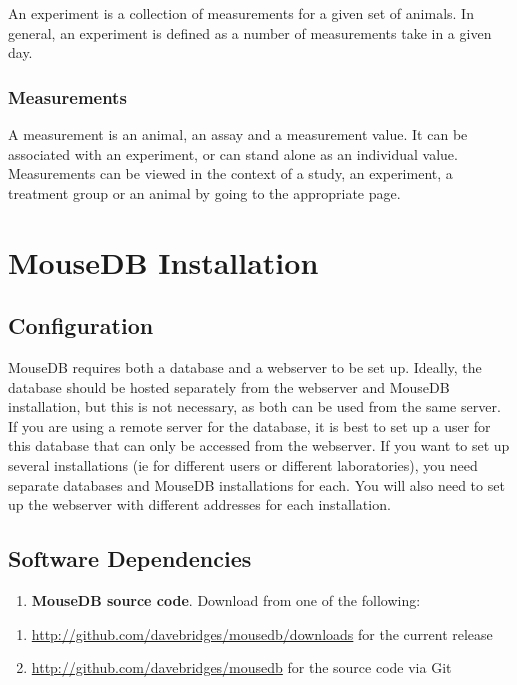 \documentclass[letterpaper,10pt,english]{sphinxmanual}
\begin{document}
An experiment is a collection of measurements for a given set of animals.  In general, an experiment is defined as a number of measurements take in a given day.


\subsection{Measurements}

A measurement is an animal, an assay and a measurement value.  It can be associated with an experiment, or can stand alone as an individual value.  Measurements can be viewed in the context of a study, an experiment, a treatment group or an animal by going to the appropriate page.

\resetcurrentobjects
\hypertarget{--doc-installation}{}

\chapter{MouseDB Installation}


\section{Configuration}

MouseDB requires both a database and a webserver to be set up.  Ideally, the database should be hosted separately from the webserver and MouseDB installation, but this is not necessary, as both can be used from the same server.  If you are using a remote server for the database, it is best to set up a user for this database that can only be accessed from the webserver.  If you want to set up several installations (ie for different users or different laboratories), you need separate databases and MouseDB installations for each.  You will also need to set up the webserver with different addresses for each installation.


\section{Software Dependencies}
\begin{enumerate}
\item {} 
\textbf{MouseDB source code}.  Download from one of the following:

\end{enumerate}
\begin{enumerate}
\item {} 
\href{http://github.com/davebridges/mousedb/downloads}{http://github.com/davebridges/mousedb/downloads} for the current release

\item {} 
\href{http://github.com/davebridges/mousedb}{http://github.com/davebridges/mousedb} for the source code via Git

\end{enumerate}
\end{document}
